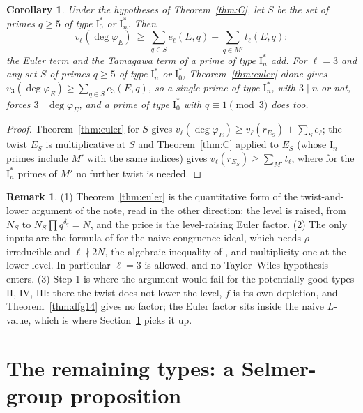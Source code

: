 \documentclass[11pt]{amsart}
\newtheorem{corollary}[theorem]{Corollary}
\theoremstyle{definition}
\newtheorem{remark}[theorem]{Remark}
\newcommand{\degphi}{\deg\varphi_E}\newcommand{\Gal}{\operatorname{Gal}}\newcommand{\ad}{\operatorname{ad}^0}
\begin{document}
\begin{corollary}\label{cor:both}
Under the hypotheses of Theorem~\ref{thm:C}, let $S$ be the set of primes $q\ge5$ of type $\mathrm{I}_0^*$ or $\mathrm{I}_n^*$. Then
\[
v_\ell(\degphi)\ \ge\ \sum_{q\in S}e_\ell(E,q)+\sum_{q\in M'}t_\ell(E,q):
\]
the Euler term and the Tamagawa term of a prime of type $\mathrm{I}_n^*$ add. For $\ell=3$ and any set $S$ of primes $q\ge5$ of type $\mathrm{I}_n^*$ or $\mathrm{I}_0^*$, Theorem~\ref{thm:euler} alone gives $v_3(\degphi)\ge\sum_{q\in S}e_3(E,q)$, so a single prime of type $\mathrm{I}_n^*$, with $3\mid n$ or not, forces $3\mid\degphi$, and a prime of type $\mathrm{I}_0^*$ with $q\equiv1\pmod3$ does too.
\end{corollary}
\begin{proof}
Theorem~\ref{thm:euler} for $S$ gives $v_\ell(\degphi)\ge v_\ell(r_{E_S})+\sum_S e_\ell$; the twist $E_S$ is multiplicative at $S$ and Theorem~\ref{thm:C} applied to $E_S$ (whose $\mathrm{I}_n$ primes include $M'$ with the same indices) gives $v_\ell(r_{E_S})\ge\sum_{M'}t_\ell$, where for the $\mathrm{I}_n^*$ primes of $M'$ no further twist is needed.
\end{proof}

\begin{remark}\label{rem:euler}
(1) Theorem~\ref{thm:euler} is the quantitative form of the twist-and-lower argument of the note, read in the other direction: the level is raised, from $N_S$ to $N_S\prod q^{\delta_q}=N$, and the price is the level-raising Euler factor. (2) The only inputs are the formula of \cite{DFG04} for the naive congruence ideal, which needs $\bar\rho$ irreducible and $\ell\nmid 2N$, the algebraic inequality of \cite[Lemma 4.17]{DDT}, and multiplicity one at the lower level. In particular $\ell=3$ is allowed, and no Taylor--Wiles hypothesis enters. (3) Step 1 is where the argument would fail for the potentially good types $\mathrm{II}$, $\mathrm{IV}$, $\mathrm{III}$: there the twist does not lower the level, $f$ is its own depletion, and Theorem~\ref{thm:dfg14} gives no factor; the Euler factor sits inside the naive $L$-value, which is where Section~\ref{sec:prop} picks it up.
\end{remark}

\section{The remaining types: a Selmer-group proposition}\label{sec:prop}
\end{document}
